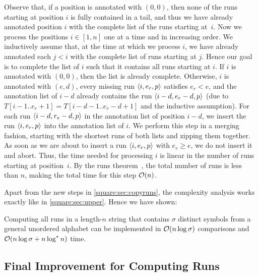 Observe that, if a position is annotated with $(0,0)$, then none of the runs starting at position $i$ is fully contained in a tail, and thus we have already annotated position $i$ with the complete list of the runs starting at~$i$. 
Now we process the positions $i \in [1, n]$ one at a time and in increasing order.
We inductively assume that, at the time at which we process $i$, we have already annotated each $j < i$ with the complete list of runs starting at $j$. Hence our goal is to complete the list of $i$ such that it contains all runs starting at $i$. If $i$ is annotated with $(0,0)$, then the list is already complete.
Otherwise, $i$ is annotated with $(e, d)$, every missing run $\left\langle i, e_r, p\right\rangle$ satisfies $e_r < e$, and the annotation list of $i - d$ already contains the run $\left\langle i - d, e_r - d, p\right\rangle$ (due to $T[i - 1..e_r + 1] = T[i - d - 1..e_r - d + 1]$ and the inductive assumption).
For each run $\left\langle i - d, r_e - d, p\right\rangle$ in the annotation list of position $i - d$, we insert the run $\left\langle i, e_r, p\right\rangle$ into the annotation list of $i$. We perform this step in a merging fashion, starting with the shortest runs of both lists and zipping them together. As soon as we are about to insert a run $\left\langle i, e_r, p\right\rangle$ with $e_r \geq e$, we do not insert it and abort. Thus, the time needed for processing $i$ is linear in the number of runs starting at position~$i$. By the runs theorem~\cite{Bannai2017}, the total number of runs is less than $n$, making the total time for this step $\mathcal{O}(n)$.

Apart from the new steps in \cref{square:sec:copyruns}, the complexity analysis works exactly like in \cref{square:sec:upper}. Hence we have shown:

\begin{theorem}
\label{thm:runsstar}
Computing all runs in a length-$n$ string that contains $\sigma$ distinct symbols from a general unordered alphabet can be implemented in $\mathcal{O}(n\log \sigma)$ comparisons and $\mathcal{O}(n\log \sigma + n \log^* n)$ time.
\end{theorem}

\subsection{Final Improvement for Computing Runs}


